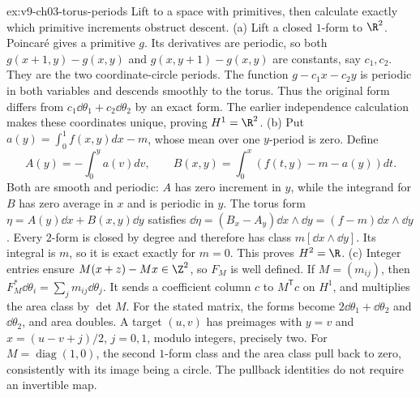 \begin{solution}{ex:v9-ch03-torus-periods}
\idea Lift to a space with primitives, then calculate exactly which primitive increments obstruct descent.
\writeup (a) Lift a closed $1$-form to $\R^2$. Poincar\'e gives a primitive $g$. Its derivatives are periodic, so both $g(x+1,y)-g(x,y)$ and $g(x,y+1)-g(x,y)$ are constants, say $c_1,c_2$. They are the two coordinate-circle periods. The function $g-c_1x-c_2y$ is periodic in both variables and descends smoothly to the torus. Thus the original form differs from $c_1\dd\theta_1+c_2\dd\theta_2$ by an exact form. The earlier independence calculation makes these coordinates unique, proving $H^1=\R^2$.
(b) Put $a(y)=\int_0^1f(x,y)dx-m$, whose mean over one $y$-period is zero. Define
\[
A(y)=-\int_0^y a(v)dv,\qquad
B(x,y)=\int_0^x(f(t,y)-m-a(y))dt.
\]
Both are smooth and periodic: $A$ has zero increment in $y$, while the integrand for $B$ has zero average in $x$ and is periodic in $y$. The torus form $\eta=A(y)\dd x+B(x,y)\dd y$ satisfies
$\dd\eta=(B_x-A_y)\dd x\wedge\dd y=(f-m)\dd x\wedge\dd y$.
Every $2$-form is closed by degree and therefore has class $m[\dd x\wedge\dd y]$. Its integral is $m$, so it is exact exactly for $m=0$. This proves $H^2=\R$.
(c) Integer entries ensure $M(x+z)-Mx\in\Z^2$, so $F_M$ is well defined. If $M=(m_{ij})$, then $F_M^*\dd\theta_i=\sum_jm_{ij}\dd\theta_j$. It sends a coefficient column $c$ to $M^{\mathsf T}c$ on $H^1$, and multiplies the area class by $\det M$. For the stated matrix, the forms become $2\dd\theta_1+\dd\theta_2$ and $\dd\theta_2$, and area doubles. A target $(u,v)$ has preimages with $y=v$ and $x=(u-v+j)/2$, $j=0,1$, modulo integers, precisely two. For $M=\operatorname{diag}(1,0)$, the second $1$-form class and the area class pull back to zero, consistently with its image being a circle. The pullback identities do not require an invertible map.
\end{solution}

